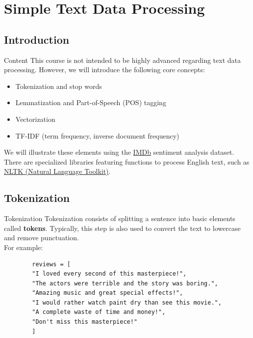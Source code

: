 \section[Simple Text Data Processing]{Simple Text Data Processing}

\subsection[Introduction]{Introduction}

\begin{frame}{Content}
	This course is not intended to be highly advanced regarding text data processing. However, we will introduce the following core concepts:
	\begin{itemize}
		\item Tokenization and stop words
		\item Lemmatization and Part-of-Speech (POS) tagging
		\item Vectorization
		\item TF-IDF (term frequency, inverse document frequency)
	\end{itemize}
	We will illustrate these elements using the \href{https://www.kaggle.com/datasets/yasserh/imdb-movie-ratings-sentiment-analysis}{IMDb} sentiment analysis dataset. There are specialized libraries featuring functions to process English text, such as \href{https://www.nltk.org/}{NLTK (Natural Language Toolkit)}.
\end{frame}

\subsection[Tokenization]{Tokenization}

\begin{frame}[fragile]{Tokenization}
	Tokenization consists of splitting a sentence into basic elements called \textbf{tokens}. Typically, this step is also used to convert the text to lowercase and remove punctuation.\\
	
	For example:
	\begin{lstlisting}
		reviews = [
		"I loved every second of this masterpiece!",
		"The actors were terrible and the story was boring.",
		"Amazing music and great special effects!",
		"I would rather watch paint dry than see this movie.",
		"A complete waste of time and money!",
		"Don't miss this masterpiece!"
		]
	\end{lstlisting}
\end{frame}

